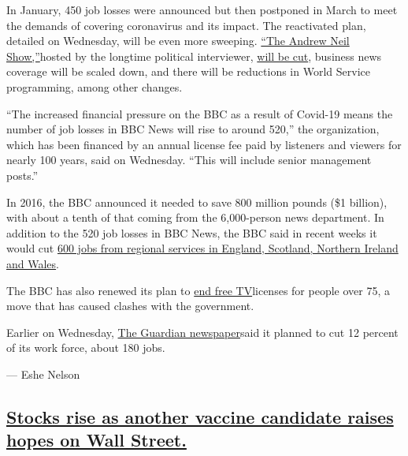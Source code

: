 In January, 450 job losses were announced but then postponed in March to
meet the demands of covering coronavirus and its impact. The reactivated
plan, detailed on Wednesday, will be even more sweeping.
\href{https://www.nytimes.com/2019/12/06/world/europe/boris-johnson-andrew-neil-interview.html}{``The
Andrew Neil Show,''}hosted by the longtime political interviewer,
\href{https://www.bbc.co.uk/news/entertainment-arts-53416067}{will be
cut}, business news coverage will be scaled down, and there will be
reductions in World Service programming, among other changes.

``The increased financial pressure on the BBC as a result of Covid-19
means the number of job losses in BBC News will rise to around 520,''
the organization, which has been financed by an annual license fee paid
by listeners and viewers for nearly 100 years, said on Wednesday. ``This
will include senior management posts.''

In 2016, the BBC announced it needed to save 800 million pounds (\$1
billion), with about a tenth of that coming from the 6,000-person news
department. In addition to the 520 job losses in BBC News, the BBC said
in recent weeks it would cut
\href{https://www.bbc.co.uk/news/entertainment-arts-53263793}{600 jobs
from regional services in England, Scotland, Northern Ireland and
Wales}.

The BBC has also renewed its plan to
\href{https://www.theguardian.com/media/2020/jul/09/bbc-to-end-free-tv-licences-for-most-over-75s}{end
free TV}licenses for people over 75, a move that has caused clashes with
the government.

Earlier on Wednesday,
\href{https://www.nytimes.com/live/2020/07/15/business/stock-market-today-coronavirus\#the-guardian-seeing-unsustainable-losses-will-cut-180-jobs}{The
Guardian newspaper}said it planned to cut 12 percent of its work force,
about 180 jobs.

--- Eshe Nelson

\hypertarget{stocks-rise-as-another-vaccine-candidate-raises-hopes-on-wall-street}{%
\subsection{\texorpdfstring{\protect\hyperlink{stocks-rise-as-another-vaccine-candidate-raises-hopes-on-wall-street}{Stocks
rise as another vaccine candidate raises hopes on Wall
Street.}}{Stocks rise as another vaccine candidate raises hopes on Wall Street.}}\label{stocks-rise-as-another-vaccine-candidate-raises-hopes-on-wall-street}}

